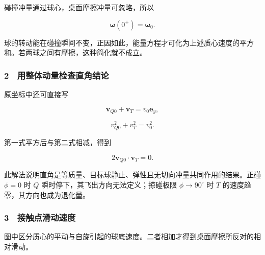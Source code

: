 \documentclass[12pt,a4paper,fontset=fandol]{ctexart}
\begin{document}
碰撞冲量通过球心，桌面摩擦冲量可忽略，所以

\[\boxed{\boldsymbol\omega(0^+)=\boldsymbol\omega_0.}\]

球的转动能在碰撞瞬间不变，正因如此，能量方程才可化为上述质心速度的平方和。若两球之间有摩擦，这种简化就不成立。

\subsubsection{2　用整体动量检查直角结论}\label{ux7528ux6574ux4f53ux52a8ux91cfux68c0ux67e5ux76f4ux89d2ux7ed3ux8bba}

原坐标中还可直接写

\[\boldsymbol v_{Q0}+\boldsymbol v_T=v_0\boldsymbol e_y,\]

\[v_{Q0}^2+v_T^2=v_0^2.\]

第一式平方后与第二式相减，得到

\[2\boldsymbol v_{Q0}\cdot\boldsymbol v_T=0.\]

此解法说明直角是等质量、目标球静止、弹性且无切向冲量共同作用的结果。正碰
\(\phi=0\) 时 \(Q\) 瞬时停下，其飞出方向无法定义；掠碰极限
\(\phi\to90^\circ\) 时 \(T\) 的速度趋零，其方向也成为退化量。

\subsubsection{3　接触点滑动速度}\label{ux63a5ux89e6ux70b9ux6ed1ux52a8ux901fux5ea6}

图中区分质心的平动与自旋引起的球底速度。二者相加才得到桌面摩擦所反对的相对滑动。
\end{document}
